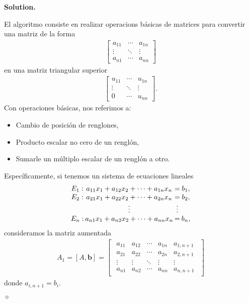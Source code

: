 \documentclass{article}
\theoremstyle{problemstyle}
\newenvironment{solution}{%
  \begin{mdframed}[linewidth=0.8pt,linecolor=Gray,backgroundcolor=Gray!5,roundcorner=5pt]%
  \noindent\textbf{Solution.}%
}{%
\hfill $ \diamond $ 
  \end{mdframed}%
}
\begin{document}
\begin{solution}
	El algoritmo consiste en realizar operacions b\'asicas de matrices para convertir una matriz de la forma
	\begin{align*}
		\begin{bmatrix}
			a_{11} & \cdots & a_{1n} \\
			\vdots & \ddots & \vdots \\
			a_{n1} & \cdots & a_{nn}
		\end{bmatrix}
	\end{align*}
	en una matriz triangular superior
	\begin{align*}
		\begin{bmatrix}
			u_{11} & \cdots & u_{1n} \\
			\vdots & \ddots & \vdots \\
			0      & \cdots & u_{nn}
		\end{bmatrix}.
	\end{align*}
	Con operaciones b\'asicas, nos referimos a:
	\begin{itemize}
		\item Cambio de posici\'on de renglones,
		\item Producto escalar no cero de un rengl\'on,
		\item Sumarle un m\'ultiplo escalar de un rengl\'on a otro.
	\end{itemize}
	Espec\'ificamente, si tenemos un sistema de ecuaciones lineales
	\begin{align*}
		\arraycolsep=1pt
		\begin{array}{cccc}
			E_{1} : & a_{11}x_{1} + a_{12}x_{2} + \cdots + a_{1n}x_{n} & =      & b_{1}, \\
			E_{2} : & a_{21}x_{1} + a_{22}x_{2} + \cdots + a_{2n}x_{n} & =      & b_{2}, \\
			        & \vdots                                           & \vdots &        \\
			E_{n} : & a_{n1}x_{1} + a_{n2}x_{2} + \cdots + a_{nn}x_{n} & =      & b_{n},
		\end{array}
	\end{align*}
	consideramos la matriz aumentada
	\begin{align*}
		A_1 = [A,\mathbf{b}] =
		\begin{bmatrix}
			\begin{array}{cccc|c}
				a_{11} & a_{12} & \cdots & a_{1n} & a_{1,n+1} \\
				a_{21} & a_{22} & \cdots & a_{2n} & a_{2,n+1} \\
				\vdots & \vdots & \ddots & \vdots & \vdots    \\
				a_{n1} & a_{n2} & \cdots & a_{nn} & a_{n,n+1}
			\end{array}
		\end{bmatrix}
	\end{align*}
	donde $ a_{i, n+1} = b_{i} $.


\end{solution}
\end{document}
